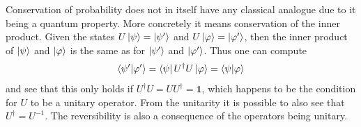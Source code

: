 Conservation of probability does not in itself have any classical analogue due to it being a quantum property. More concretely it means conservation of the inner product. Given the states $U\ket{\psi} = \ket{\psi'}$ and $U\ket{\varphi} = \ket{\varphi'}$, then the inner product of $\ket{\psi}$ and $\ket{\varphi}$ is the same as for $\ket{\psi'}$ and $\ket{\varphi'}$. Thus one can compute
\begin{equation}
\bra{\psi'}\ket{\varphi'} = \bra{\psi}U^\dagger U\ket{\varphi} = \bra{\psi}\ket{\varphi}
\end{equation}
and see that this only holds if $U^\dagger U = UU^\dagger = \mathbf{1}$, which happens to be the condition for $U$ to be a unitary operator. From the unitarity it is possible to also see that $U^\dagger = U^{-1}$. The reversibility is also a consequence of the operators being unitary.
